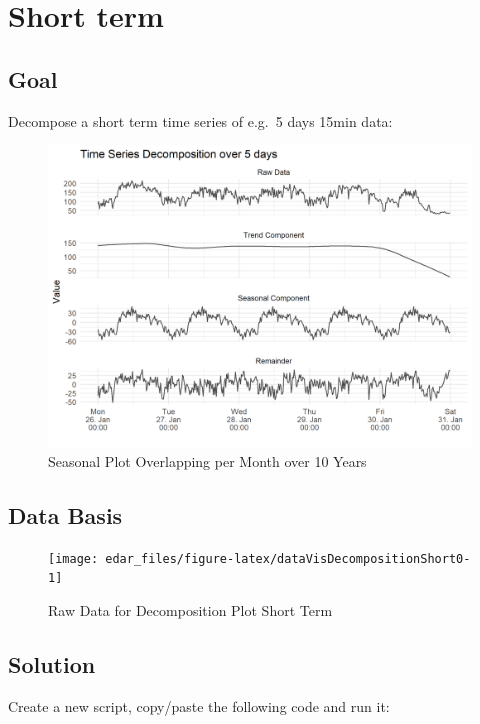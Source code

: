 \documentclass[
  a4paperpaper,
]{book}
\begin{document}
\newpage

\hypertarget{short-term}{%
\section{Short term}\label{short-term}}

\hypertarget{goal-5}{%
\subsection{Goal}\label{goal-5}}

Decompose a short term time series of e.g.~5 days 15min data:

\begin{figure}
\includegraphics[width=0.7\linewidth]{images/plotDecompositionShort} \caption{Seasonal Plot Overlapping per Month over 10 Years}\label{fig:unnamed-chunk-14}
\end{figure}

\hypertarget{data-basis-5}{%
\subsection{Data Basis}\label{data-basis-5}}

\begin{figure}
\texttt{[image: edar\_files/figure-latex/dataVisDecompositionShort0-1]} \caption{Raw Data for Decomposition Plot Short Term}\label{fig:dataVisDecompositionShort0}
\end{figure}

\newpage

\hypertarget{solution-5}{%
\subsection{Solution}\label{solution-5}}

Create a new script, copy/paste the following code and run it:
\end{document}
